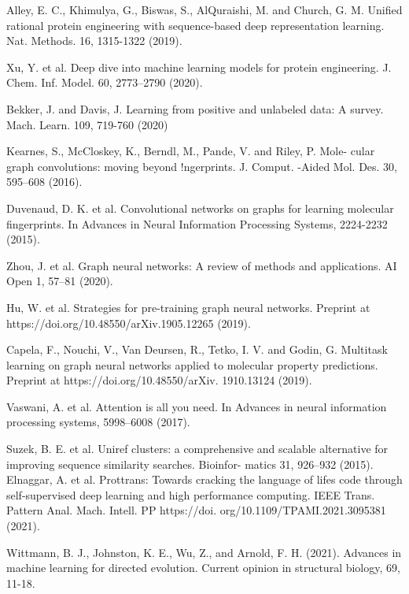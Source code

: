 \documentclass[12pt]{article}
\begin{document}
\begin{thebibliography}{99}
 Alley, E. C., Khimulya, G., Biswas, S., AlQuraishi, M. and Church, G. M. Unified rational protein engineering with sequence-based deep representation learning. Nat. Methods. 16, 1315-1322 (2019).

 Xu, Y. et al. Deep dive into machine learning models for protein engineering. J. Chem. Inf. Model. 60, 2773–2790 (2020).

 Bekker, J. and Davis, J. Learning from positive and unlabeled data: A survey. Mach. Learn. 109, 719-760 (2020)


 Kearnes, S., McCloskey, K., Berndl, M., Pande, V. and  Riley, P. Mole- cular graph convolutions: moving beyond !ngerprints. J. Comput. -Aided Mol. Des. 30, 595–608 (2016).

 Duvenaud, D. K. et al. Convolutional networks on graphs for learning molecular fingerprints. In Advances in Neural Information Processing Systems, 2224-2232 (2015).

 Zhou, J. et al. Graph neural networks: A review of methods and applications. AI Open 1, 57–81 (2020).

 Hu, W. et al. Strategies for pre-training graph neural networks. Preprint at https://doi.org/10.48550/arXiv.1905.12265 (2019). 



 Capela, F., Nouchi, V., Van Deursen, R., Tetko, I. V. and  Godin, G. Multitask learning on graph neural networks applied to molecular property predictions. Preprint at https://doi.org/10.48550/arXiv. 1910.13124 (2019).

  Vaswani, A. et al. Attention is all you need. In Advances in neural information processing systems, 5998–6008 (2017).

 Suzek, B. E. et al. Uniref clusters: a comprehensive and scalable alternative for improving sequence similarity searches. Bioinfor- matics 31, 926–932 (2015).
 Elnaggar, A. et al. Prottrans: Towards cracking the language of lifes code through self-supervised deep learning and high performance computing. IEEE Trans. Pattern Anal. Mach. Intell. PP https://doi. org/10.1109/TPAMI.2021.3095381 (2021).


 Wittmann, B. J., Johnston, K. E., Wu, Z., and  Arnold, F. H. (2021). Advances in machine learning for directed evolution. Current opinion in structural biology, 69, 11-18.
\end{thebibliography}
\end{document}
